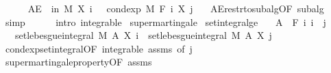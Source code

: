 \begin{isabellebody}
\ \ \ \ \isamarkupfalse%
\ {\isachardoublequoteopen}AE\ {\isasymxi}\ in\ M{\isachardot}{\kern0pt}\ X\ i\ {\isasymxi}\ {\isasymle}\ cond{\isacharunderscore}{\kern0pt}exp\ M\ {\isacharparenleft}{\kern0pt}F\ i{\isacharparenright}{\kern0pt}\ {\isacharparenleft}{\kern0pt}X\ j{\isacharparenright}{\kern0pt}\ {\isasymxi}{\isachardoublequoteclose}\ \isamarkupfalse%
\ AE{\isacharunderscore}{\kern0pt}restr{\isacharunderscore}{\kern0pt}to{\isacharunderscore}{\kern0pt}subalg{\isacharbrackleft}{\kern0pt}OF\ subalg{\isacharbrackright}{\kern0pt}\ \isamarkupfalse%
\ simp\isanewline
\ \ \ \ \isacommand{{\isacharbraceright}{\kern0pt}}\isamarkupfalse%
\isanewline
{}\isamarkupfalse%
\ {\isacharparenleft}{\kern0pt}intro\ integrable{\isacharparenright}{\kern0pt}%
\endisatagproof
{\isafoldproof}%
%
\isadelimproof
%
\endisadelimproof
%
\isadelimdocument
%
\endisadelimdocument
%
\isatagdocument
%
\isamarkuptrue%
%
\endisatagdocument
{\isafolddocument}%
%
\isadelimdocument
%
\endisadelimdocument
{}\isamarkupfalse%
\ supermartingale\isanewline
{}\isanewline
\isanewline
{}\isamarkupfalse%
\ set{\isacharunderscore}{\kern0pt}integral{\isacharunderscore}{\kern0pt}ge{\isacharcolon}{\kern0pt}\isanewline
\ \ \ {\isachardoublequoteopen}A\ {\isasymin}\ F\ i{\isachardoublequoteclose}\ {\isachardoublequoteopen}i\ {\isasymle}\ j{\isachardoublequoteclose}\isanewline
\ \ \ {\isachardoublequoteopen}set{\isacharunderscore}{\kern0pt}lebesgue{\isacharunderscore}{\kern0pt}integral\ M\ A\ {\isacharparenleft}{\kern0pt}X\ i{\isacharparenright}{\kern0pt}\ {\isasymge}\ set{\isacharunderscore}{\kern0pt}lebesgue{\isacharunderscore}{\kern0pt}integral\ M\ A\ {\isacharparenleft}{\kern0pt}X\ j{\isacharparenright}{\kern0pt}{\isachardoublequoteclose}\isanewline
%
\isadelimproof
\ \ %
\endisadelimproof
%
\isatagproof
{}\isamarkupfalse%
\ cond{\isacharunderscore}{\kern0pt}exp{\isacharunderscore}{\kern0pt}set{\isacharunderscore}{\kern0pt}integral{\isacharbrackleft}{\kern0pt}OF\ integrable\ assms{\isacharparenleft}{\kern0pt}{}{\isacharparenright}{\kern0pt}{\isacharcomma}{\kern0pt}\ of\ j{\isacharbrackright}{\kern0pt}\isanewline
\ \ \isamarkupfalse%
\ supermartingale{\isacharunderscore}{\kern0pt}property{\isacharbrackleft}{\kern0pt}OF\ assms{\isacharparenleft}{\kern0pt}{}{\isacharparenright}{\kern0pt}{\isacharbrackright}{\kern0pt}\ \isanewline
\ \ \isamarkupfalse%

\end{isabellebody}

